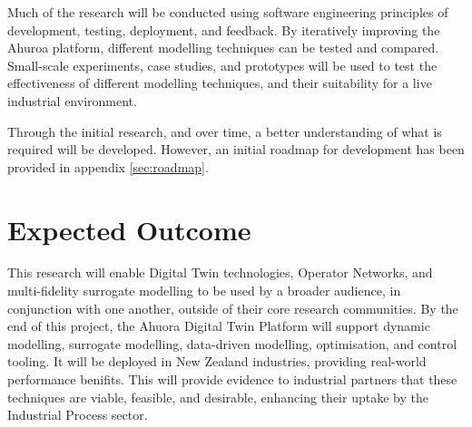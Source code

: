 \documentclass[12pt]{article}
\begin{document}
Much of the research will be conducted using software engineering principles of development, testing, deployment, and feedback. By iteratively improving the Ahuroa platform, different modelling techniques can be tested and compared. Small-scale experiments, case studies, and prototypes will be used to test the effectiveness of different modelling techniques, and their suitability for a live industrial environment.

Through the initial research, and over time, a better understanding of what is required will be developed. However, an initial roadmap for development has been provided in appendix \ref{sec:roadmap}.

\section{Expected Outcome}


This research will enable Digital Twin technologies, Operator Networks, and multi-fidelity surrogate modelling to be used by a broader audience, in conjunction with one another, outside of their core research communities.
By the end of this project, the Ahuora Digital Twin Platform will support dynamic modelling, surrogate modelling, data-driven modelling, optimisation, and control tooling. It will be deployed in New Zealand industries, providing real-world performance benifits. This will provide evidence to industrial partners that these techniques are viable, feasible, and desirable, enhancing their uptake by the Industrial Process sector.








\end{document}
